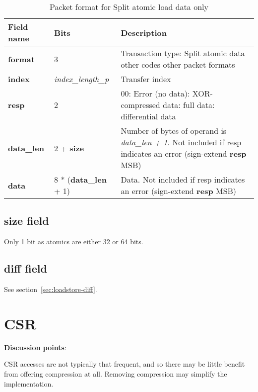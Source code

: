 \begin{table}[htp]
  \centering
  \caption{Packet format for Split atomic load data only}
  \label{tab:te_datadx0y9}
  \begin{tabulary}{\textwidth}{|l|p{40mm}|p{90mm}|}
    \hline
    {\bf Field name} & {\bf Bits} & {\bf Description} \\
    \hline
    \textbf{format} & 	3	& Transaction type: Split atomic data\newline	
		other codes other packet formats\\
    \hline
    \textbf{index} & \textit{index\_length\_p} & Transfer index\\
    \textbf{resp} & 2 & 00: Error (no data):  XOR-compressed data: full data: differential data\\
    \hline
    \textbf{data\_len} & 2 + \textbf{size} &	Number of bytes of operand is \textit{data\_len + 1}. Not included if resp indicates an error (sign-extend \textbf{resp} MSB)\\
    \hline
    \textbf{data} &  8 * (\textbf{data\_len} + 1) & Data. Not included if resp indicates an error (sign-extend \textbf{resp} MSB)\\
    \hline
  \end{tabulary}
\end{table}

\subsection{size field} \label{sec:atomic-size}

Only 1 bit as atomics are either 32 or 64 bits.

\subsection{diff field} \label{sec:atomic-diff}

See section~\ref{sec:loadstore-diff}.

\FloatBarrier
\section{CSR} \label{sec:data-csr}

\textbf{Discussion points}:

CSR accesses are not typically that frequent, and so there may be little benefit from offering compression at
all.  Removing compression may simplify the implementation.  

